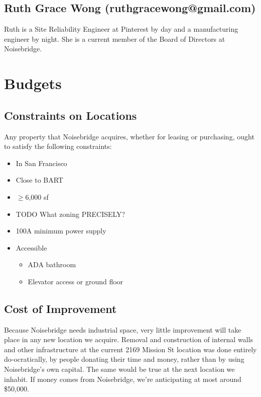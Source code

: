 \documentclass[12pt]{article}
\begin{document}
\subsection{Ruth Grace Wong (ruthgracewong@gmail.com)} Ruth is a Site Reliability Engineer at Pinterest by day and a manufacturing engineer by night. She is a current member of the Board of Directors at Noisebridge.


\section{Budgets}

\subsection{Constraints on Locations}

Any property that Noisebridge acquires, whether for leasing or purchasing, ought to satisfy the following constraints:

\begin{itemize}
    \item In San Francisco
    \item Close to BART
    \item $\geq$6,000 sf
    \item TODO What zoning PRECISELY?
    \item 100A minimum power supply
    \item Accessible
        \begin{itemize}
            \item ADA bathroom
            \item Elevator access or ground floor
        \end{itemize}
\end{itemize}



\subsection{Cost of Improvement}

Because Noisebridge needs industrial space, very little improvement will take place in any new location we acquire. Removal and construction of internal walls and other infrastructure at the current 2169 Mission St location was done entirely do-ocratically, by people donating their time and money, rather than by using Noisebridge's own capital. The same would be true at the next location we inhabit. If money comes from Noisebridge, we're anticipating at most around \$50,000.
\end{document}

